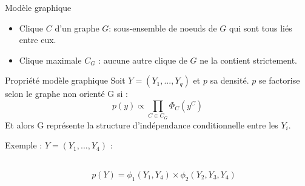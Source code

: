 \documentclass{bredelebeamer}
\begin{document}
\begin{frame}{Modèle graphique }
\begin{itemize}
\item Clique $C$ d'un graphe $G$: sous-ensemble de noeuds de $G$ qui sont tous liés entre eux.\\

\item Clique maximale $C_{G}$ : aucune autre clique de $G$ ne la contient strictement.\\

\end{itemize}

\begin{exampleblock}{Propriété modèle graphique \cite{Lau96}}
Soit  $Y = (Y_1,...,Y_q)$ et $p$ sa densité. $p$ se factorise selon le graphe non orienté G si :
\[ p(y) \propto \prod_{C \in C_G} \Phi_C (y^C) \]
Et alors G représente la structure d'indépendance conditionnelle entre les $Y_i$.
\end{exampleblock} 
Exemple : $Y=(Y_1,...,Y_4)$ : \\
\begin{columns}
 \begin{column}{0.35\linewidth}
 \begin{flushright}

 \\
\end{flushright}
 \end{column}
 \begin{column}{0.6\linewidth}
 \begin{flushleft}
    $p(Y) = \phi_1(Y_1,Y_4) \times \phi_2(Y_2,Y_3,Y_4)$
 \end{flushleft}
 \end{column}
\end{columns}
\end{frame}
\end{document}

